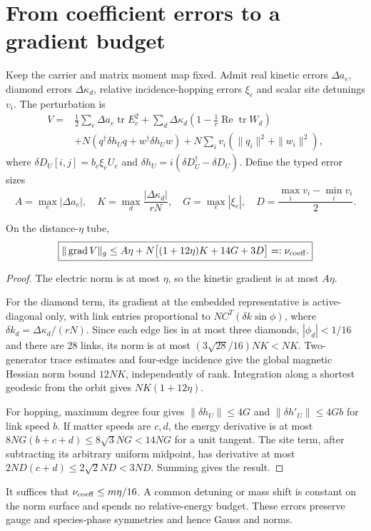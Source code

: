 \documentclass[11pt,a4paper]{article}
\newcommand{\tr}{\operatorname{tr}}\newcommand{\diag}{\operatorname{diag}}\newcommand{\Rea}{\operatorname{Re}}\newcommand{\id}{\mathbf1}\newcommand{\grad}{\operatorname{grad}}
\begin{document}
\section{From coefficient errors to a gradient budget}
Keep the carrier and matrix moment map fixed. Admit real kinetic errors $\Delta a_e$, diamond errors $\Delta\kappa_d$, relative incidence-hopping errors $\xi_e$ and scalar site detunings $v_i$. The perturbation is
\begin{align*}
V={}&\frac12\sum_e\Delta a_e\tr E_e^2
+\sum_d\Delta\kappa_d\left(1-\frac1r\Rea\tr W_d\right)\\
&+N(q^\dagger\delta h_Uq+w^\dagger\delta h_Uw)
+N\sum_i v_i(\|q_i\|^2+\|w_i\|^2),
\end{align*}
where $\delta D_U[i,j]=b_e\xi_eU_e$ and $\delta h_U=i(\delta D_U^\dagger-\delta D_U)$. Define the typed error sizes
\[
A=\max_e|\Delta a_e|,\quad K=\max_d\frac{|\Delta\kappa_d|}{rN},\quad
G=\max_e|\xi_e|,\quad D=\frac{\max_i v_i-\min_i v_i}{2}.
\]
\begin{lemma}\label{lem:coeff}
On the distance-$\eta$ tube,
\[
\boxed{\|\grad V\|_g\le A\eta+
N\big[(1+12\eta)K+14G+3D\big]=:\nu_{\rm coeff}.}
\]
\end{lemma}
\begin{proof}
The electric norm is at most $\eta$, so the kinetic gradient is at most $A\eta$.

For the diamond term, its gradient at the embedded representative is active-diagonal only, with link entries proportional to $NC^T(\delta k\sin\phi)$, where $\delta k_d=\Delta\kappa_d/(rN)$. Since each edge lies in at most three diamonds, $|\phi_d|<1/16$ and there are 28 links, its norm is at most $(3\sqrt{28}/16)NK<NK$. Two-generator trace estimates and four-edge incidence give the global magnetic Hessian norm bound $12NK$, independently of rank. Integration along a shortest geodesic from the orbit gives $NK(1+12\eta)$.

For hopping, maximum degree four gives $\|\delta h_U\|\le4G$ and $\|\delta h'_U\|\le4Gb$ for link speed $b$. If matter speeds are $c,d$, the energy derivative is at most $8NG(b+c+d)\le8\sqrt3NG<14NG$ for a unit tangent. The site term, after subtracting its arbitrary uniform midpoint, has derivative at most $2ND(c+d)\le2\sqrt2ND<3ND$. Summing gives the result.
\end{proof}
It suffices that $\nu_{\rm coeff}\le m\eta/16$. A common detuning or mass shift is constant on the norm surface and spends no relative-energy budget. These errors preserve gauge and species-phase symmetries and hence Gauss and norms.
\end{document}
